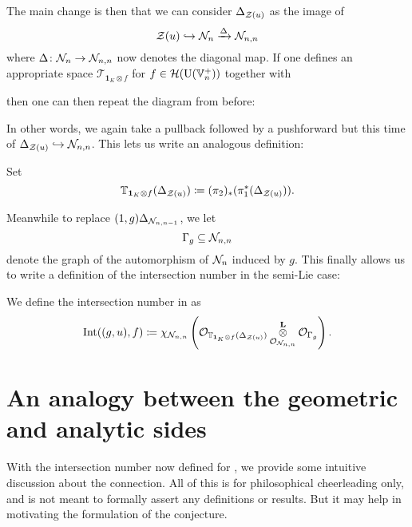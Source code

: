 The main change is then that we can consider $\Delta_{\mathcal Z(u)}$ as the image of
\[ \mathcal Z(u) \hookrightarrow \mathcal N_n \xrightarrow{\Delta} \mathcal N_{n,n} \]
where $\Delta \colon \mathcal N_n \to \mathcal N_{n,n}$ now denotes the diagonal map.
If one defines an appropriate space $\mathcal T_{\mathbf{1}_K \otimes f}$ for $f \in \mathcal H(\operatorname{U}(\mathbb V_n^+))$ together with
\begin{center}
\end{center}
then one can then repeat the diagram from before:
\begin{center}
\end{center}
In other words, we again take a pullback followed by a pushforward
but this time of $\Delta_{\mathcal Z(u)} \hookrightarrow \mathcal N_{n,n}$.
This lets us write an analogous definition:
\begin{definition}
  Set
  \[
    \mathbb T_{\mathbf{1}_K \otimes f} (\Delta_{\mathcal Z(u)})
    \coloneqq (\pi_2)_\ast(\pi_1^\ast(\Delta_{\mathcal Z(u)})).
  \]
\end{definition}
Meanwhile to replace $(1,g) \Delta_{\mathcal N_{n,n-1}}$, we let
\[ \Gamma_g \subseteq \mathcal N_{n,n} \]
denote the graph of the automorphism of $\mathcal N_n$ induced by $g$.
This finally allows us to write a definition of the intersection number in the semi-Lie case:
\begin{definition}
  We define the intersection number in  as
  \[
    \operatorname{Int}((g,u), f)
    \coloneqq \chi_{\mathcal N_{n,n}} \left(
      \mathcal{O}_{\mathbb T_{\mathbf{1}_K \otimes f}(\Delta_{\mathcal Z(u)})}
      \mathop{\otimes}^{\mathbf{L}}_{\mathcal{O}_{\mathcal N_{n,n}}} \mathcal{O}_{\Gamma_g} \right).
  \]
  \label{def:intersection_number_semi_lie_spherical}
\end{definition}

\section{An analogy between the geometric and analytic sides}
With the intersection number now defined for ,
we provide some intuitive discussion about the connection.
All of this is for philosophical cheerleading only,
and is not meant to formally assert any definitions or results.
But it may help in motivating the formulation of the conjecture.

